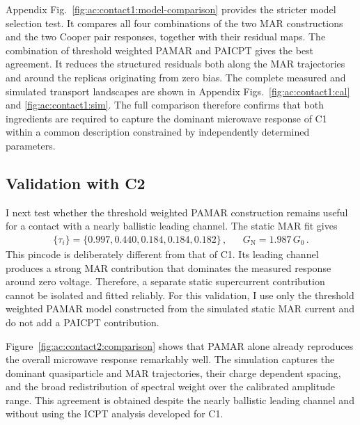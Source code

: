         Appendix Fig.~\ref{fig:ac:contact1:model-comparison} provides the stricter model selection test. It compares all four combinations of the two MAR constructions and the two Cooper pair responses, together with their residual maps. The combination of threshold weighted PAMAR and PAICPT gives the best agreement. It reduces the structured residuals both along the MAR trajectories and around the replicas originating from zero bias. The complete measured and simulated transport landscapes are shown in Appendix Figs.~\ref{fig:ac:contact1:cal} and \ref{fig:ac:contact1:sim}. The full comparison therefore confirms that both ingredients are required to capture the dominant microwave response of C1 within a common description constrained by independently determined parameters.

    \subsection*{Validation with C2}

        I next test whether the threshold weighted PAMAR construction remains useful for a contact with a nearly ballistic leading channel. The static MAR fit gives
        \begin{align}
            \{\tau_i\} = \{0.997, 0.440, 0.184, 0.184, 0.182\}\,, &&
            G_\mathrm{N} = 1.987\,G_0\,.
            \label{eq:ac:contact2:pincode}
        \end{align}
        This pincode is deliberately different from that of C1. Its leading channel produces a strong MAR contribution that dominates the measured response around zero voltage. Therefore, a separate static supercurrent contribution cannot be isolated and fitted reliably. For this validation, I use only the threshold weighted PAMAR model constructed from the simulated static MAR current and do not add a PAICPT contribution.


        Figure~\ref{fig:ac:contact2:comparison} shows that PAMAR alone already reproduces the overall microwave response remarkably well. The simulation captures the dominant quasiparticle and MAR trajectories, their charge dependent spacing, and the broad redistribution of spectral weight over the calibrated amplitude range. This agreement is obtained despite the nearly ballistic leading channel and without using the ICPT analysis developed for C1.

